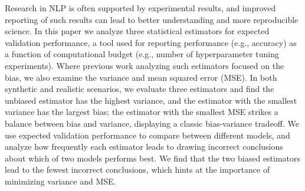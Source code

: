 Research in NLP is often supported by experimental results, and improved reporting of such results can lead to better understanding and more reproducible science. In this paper we analyze three statistical estimators for expected validation performance, a tool used for reporting performance (e.g., accuracy) as a function of computational budget (e.g., number of hyperparameter tuning experiments). Where previous work analyzing such estimators focused on the bias, we also examine the variance and mean squared error (MSE). In both synthetic and realistic scenarios, we evaluate three estimators and find the unbiased estimator has the highest variance, and the estimator with the smallest variance has the largest bias; the estimator with the smallest MSE strikes a balance between bias and variance, displaying a classic bias-variance tradeoff. We use expected validation performance to compare between different models, and analyze how frequently each estimator leads to drawing incorrect conclusions about which of two models performs best. We find that the two biased estimators lead to the fewest incorrect conclusions, which hints at the importance of minimizing variance and MSE.
